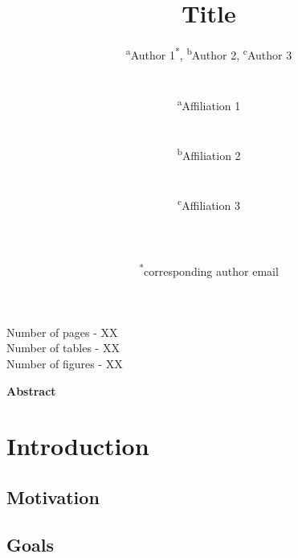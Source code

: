 \documentclass[11pt,a4paper]{article}
\begin{document}
\begin{titlepage}
    \title{Title}
    \author{
        \textsuperscript{a}Author 1\textsuperscript{*}, 
        \textsuperscript{b}Author 2, 
        \textsuperscript{c}Author 3
        \\ \\ \\
        \textsuperscript{a}Affiliation 1\\ 
        \\ \\
        \textsuperscript{b}Affiliation 2\\ 
        \\ \\
        \textsuperscript{c}Affiliation 3\\
        \\ \\ \\
        \textsuperscript{*}corresponding author email
    }
\clearpage %
\maketitle
\vspace*{\fill}
\begin{flushright}{
        \noindent Number of pages - XX \\
        \noindent Number of tables - XX \\
        \noindent Number of figures - XX
}
\end{flushright}
\thispagestyle{empty} %
\end{titlepage}

\onehalfspacing %
\linenumbers %
\pagewiselinenumbers %
\modulolinenumbers[3] %

\noindent\textbf{\Large{Abstract}} \\ \label{abstract}

\newpage

\section{Introduction} \label{introduction}
\subsection{Motivation} \label{motivation}
\subsection{Goals} \label{goals}
\end{document}

